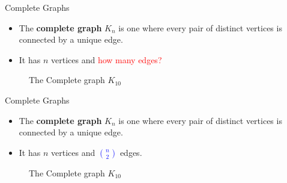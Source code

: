 \documentclass{beamer}
\theoremstyle{plain}
\begin{document}
\begin{frame}{Complete Graphs}
\pause
    \begin{itemize}
        \item The \textbf{complete graph} $K_n$ is one where every pair of distinct vertices is connected by a unique edge.
        \pause
        \item It has $n$ vertices and \textcolor{red}{how many edges?}
    \end{itemize}
    \pause
    \begin{figure}
    \begin{center}
    \end{center}
    \caption{The Complete graph $K_{10}$}
    \end{figure}
\end{frame}
\begin{frame}{Complete Graphs}
    \begin{itemize}
        \item The \textbf{complete graph} $K_n$ is one where every pair of distinct vertices is connected by a unique edge.
        \item It has $n$ vertices and \textcolor{blue}{$\binom{n}{2}$} edges.
    \end{itemize}

    \begin{figure}
    \begin{center}
    \end{center}
    \caption{The Complete graph $K_{10}$}
    \end{figure}
\end{frame}

\end{document}

